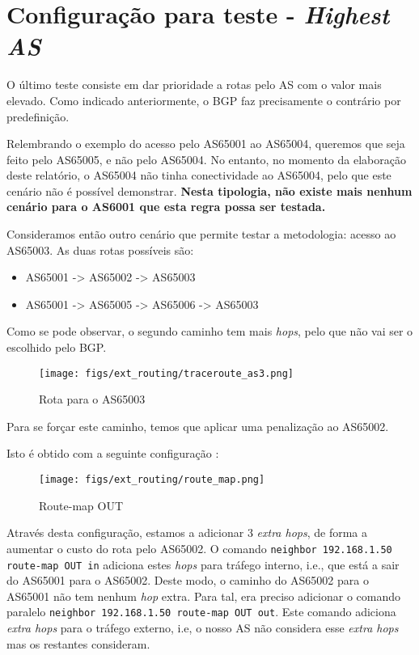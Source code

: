 \section{Configuração para teste - \textit{Highest AS}}

O último teste consiste em dar prioridade a rotas pelo AS com o valor mais elevado.
Como indicado anteriormente, o BGP faz precisamente o contrário por predefinição.

Relembrando o exemplo do acesso pelo AS65001 ao AS65004, queremos que seja feito pelo AS65005, e não pelo AS65004.
No entanto, no momento da elaboração deste relatório, o AS65004 não tinha conectividade ao AS65004, pelo que este cenário não é possível demonstrar.
\textbf{Nesta tipologia, não existe mais nenhum cenário para o AS6001 que esta regra possa ser testada.}

Consideramos então outro cenário que permite testar a metodologia: acesso ao AS65003.
As duas rotas possíveis são:
\begin{itemize}
    \item AS65001 -> AS65002 -> AS65003
    \item AS65001 -> AS65005 -> AS65006 -> AS65003
\end{itemize}

Como se pode observar, o segundo caminho tem mais \textit{hops}, pelo que não vai ser o escolhido pelo BGP.

\begin{figure}[H]
    \centering
    \texttt{[image: figs/ext\_routing/traceroute\_as3.png]}
    \caption{Rota para o AS65003}
    \label{fig:traceroute_as3}
\end{figure}

Para se forçar este caminho, temos que aplicar uma penalização ao AS65002.

Isto é obtido com a seguinte configuração \cite{cisco_route_map}:

\begin{figure}[H]
    \centering
    \texttt{[image: figs/ext\_routing/route\_map.png]}
    \caption{Route-map OUT}
    \label{fig:route_map}
\end{figure}


Através desta configuração, estamos a adicionar 3 \textit{extra hops}, de forma a aumentar o custo do rota pelo AS65002.
O comando \verb|neighbor 192.168.1.50 route-map OUT in| adiciona estes \textit{hops} para tráfego interno, i.e., que está a sair do AS65001 para o AS65002.
Deste modo, o caminho do AS65002 para o AS65001 não tem nenhum \textit{hop} extra.
Para tal, era preciso adicionar o comando paralelo \verb|neighbor 192.168.1.50 route-map OUT out|.
Este comando adiciona \textit{extra hops} para o tráfego externo, i.e, o nosso AS não considera esse \textit{extra hops} mas os restantes consideram.

